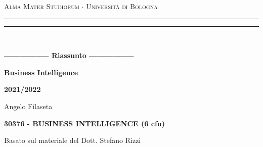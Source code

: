 \begin{titlepage}
    \begin{center}
        {{\Large{\textsc{Alma Mater Studiorum $\cdot$ Università di Bologna}}}}
        \rule[0.1cm]{15.8cm}{0.1mm}
        \rule[0.5cm]{15.8cm}{0.6mm}
        \\
        \vspace{3mm}
    \end{center}
    \vspace{2mm}
    \begin{center}
        {\LARGE{\bf{----------------- Riassunto -----------------}}}
        \vspace{5mm} \par \noindent
        {\Huge{\bf{Business Intelligence}}}
        \vspace{10mm} \par \noindent
        {\LARGE \textbf{2021/2022}}
        \vspace{15mm} \par \noindent
        {\Large Angelo Filaseta}
        \vspace{15mm} \par \noindent
        {\LARGE \bf{30376 - BUSINESS INTELLIGENCE (6 cfu)}}
        \vspace{8mm} \par \noindent
        {\Large Basato sul materiale del Dott. Stefano Rizzi}~\cite{StefanoR21:online}
    \end{center}
    \hfill
    \vspace{40mm}
\end{titlepage}
